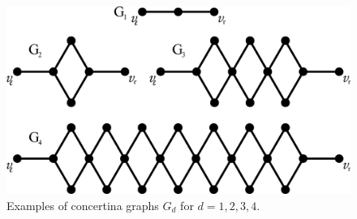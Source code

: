 \fi

\begin{figure}[th]
  \centering
  \includegraphics[scale=0.3]{figures/eps/tight}
  \caption{Examples of concertina graphs $G_d$ for $d=1,2,3,4$.}
  \label{fig:tightgraphs}
\end{figure}

